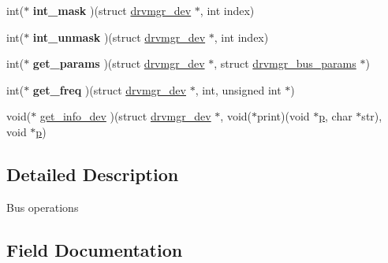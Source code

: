 \begin{DoxyCompactItemize}
\item 
\mbox{\label{structdrvmgr__bus__ops_a35b6498764395a08b64a684313281a69}} 
int($\ast$ {\bfseries int\+\_\+mask} )(struct \mbox{\hyperlink{structdrvmgr__dev}{drvmgr\+\_\+dev}} $\ast$, int index)
\item 
\mbox{\label{structdrvmgr__bus__ops_addc4615bccda23b34fc5bb5308a22d86}} 
int($\ast$ {\bfseries int\+\_\+unmask} )(struct \mbox{\hyperlink{structdrvmgr__dev}{drvmgr\+\_\+dev}} $\ast$, int index)
\item 
\mbox{\label{structdrvmgr__bus__ops_a8beac5a24412baf7d4041f62dd4fd461}} 
int($\ast$ {\bfseries get\+\_\+params} )(struct \mbox{\hyperlink{structdrvmgr__dev}{drvmgr\+\_\+dev}} $\ast$, struct \mbox{\hyperlink{structdrvmgr__bus__params}{drvmgr\+\_\+bus\+\_\+params}} $\ast$)
\item 
\mbox{\label{structdrvmgr__bus__ops_a0670fdad27b77d7de9bedc169a06596b}} 
int($\ast$ {\bfseries get\+\_\+freq} )(struct \mbox{\hyperlink{structdrvmgr__dev}{drvmgr\+\_\+dev}} $\ast$, int, unsigned int $\ast$)
\item 
void($\ast$ \mbox{\hyperlink{structdrvmgr__bus__ops_a08024cc67a568af88a3360de629e656e}{get\+\_\+info\+\_\+dev}} )(struct \mbox{\hyperlink{structdrvmgr__dev}{drvmgr\+\_\+dev}} $\ast$, void($\ast$print)(void $\ast$\mbox{\hyperlink{sun4u_2tte_8h_a27952ffc298d15b4fc0e7ee6b2a044ac}{p}}, char $\ast$str), void $\ast$\mbox{\hyperlink{sun4u_2tte_8h_a27952ffc298d15b4fc0e7ee6b2a044ac}{p}})
\end{DoxyCompactItemize}


\subsection{Detailed Description}
Bus operations 

\subsection{Field Documentation}
\mbox{\label{structdrvmgr__bus__ops_a08024cc67a568af88a3360de629e656e}} 
